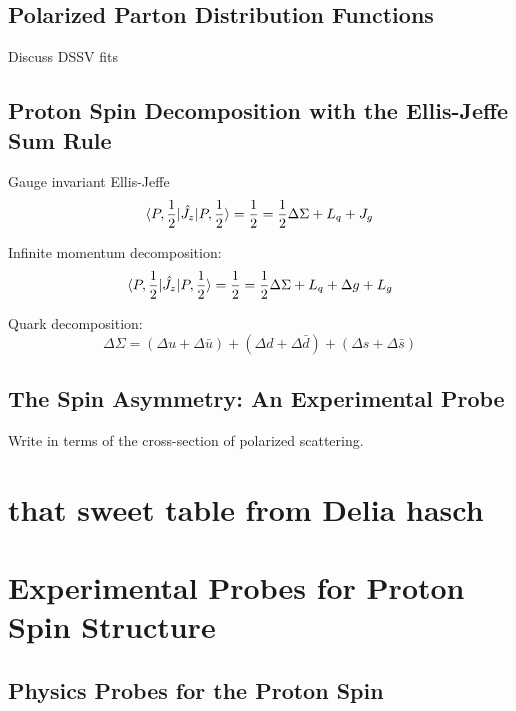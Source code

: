 \subsection{Polarized Parton Distribution Functions}
\label{sec:polarized_pdfs}
Discuss DSSV fits
\subsection{ Proton Spin Decomposition with the Ellis-Jeffe Sum Rule }

Gauge invariant Ellis-Jeffe
\begin{equation}
  \braket{P,{1\over2}|\hat{J_z}|P,{1\over2}}  
 = {1\over2} = {{1\over2}\Delta \Sigma +L_q+J_g}
\label{eq:ellis_jeffe_sum}
\end{equation}

Infinite momentum decomposition:
\begin{equation}
  \braket{P,{1\over2}|\hat{J_z}|P,{1\over2}}  
  = {1\over2} = {{1\over2}\Delta \Sigma +L_q+\Delta g + L_g}
  \label{eq:infmom_ellis_jeffe_sum}
\end{equation}

Quark decomposition:
\begin{equation}
  {\Delta \Sigma} =
  {
    (\Delta u+\Delta \bar{u})
    +(\Delta d + \Delta \bar{d})
    +(\Delta s + \Delta \bar{s})
  }
  \label{eq:quark_spin_decomposition}
\end{equation}

\subsection{ The Spin Asymmetry: An Experimental Probe }
Write in terms of the cross-section of polarized scattering.
\section{ that sweet table from Delia hasch}

\section{Experimental Probes for Proton Spin Structure}
\subsection{Physics Probes for the Proton Spin}

